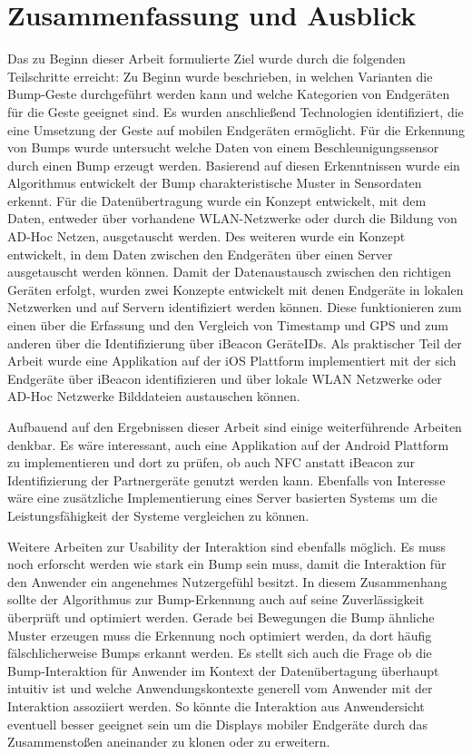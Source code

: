 \chapter{Zusammenfassung und Ausblick}
\label{Kap6}
\label{chap:Kap6}

Das zu Beginn dieser Arbeit formulierte Ziel wurde durch die folgenden Teilschritte erreicht: Zu Beginn wurde beschrieben, in welchen Varianten die Bump-Geste durchgeführt werden kann und welche Kategorien von Endgeräten für die Geste geeignet sind. Es wurden anschließend Technologien identifiziert, die eine Umsetzung der Geste auf mobilen Endgeräten ermöglicht. Für die Erkennung von Bumps wurde untersucht welche Daten von einem Beschleunigungssensor durch einen Bump erzeugt werden. Basierend auf diesen Erkenntnissen wurde ein Algorithmus entwickelt der Bump charakteristische Muster in Sensordaten erkennt. Für die Datenübertragung wurde ein Konzept entwickelt, mit dem Daten, entweder über vorhandene WLAN-Netzwerke oder durch die Bildung von AD-Hoc Netzen, ausgetauscht werden. Des weiteren wurde ein Konzept entwickelt, in dem Daten zwischen den Endgeräten über einen Server ausgetauscht werden können. Damit der Datenaustausch zwischen den richtigen Geräten erfolgt, wurden zwei Konzepte entwickelt mit denen Endgeräte in lokalen Netzwerken und auf Servern identifiziert werden können. Diese funktionieren zum einen über die Erfassung und den Vergleich von Timestamp und GPS und zum anderen über die Identifizierung über iBeacon GeräteIDs. Als praktischer Teil der Arbeit wurde eine Applikation auf der iOS Plattform implementiert mit der sich Endgeräte über iBeacon identifizieren und über lokale WLAN Netzwerke oder AD-Hoc Netzwerke Bilddateien austauschen können.

Aufbauend auf den Ergebnissen dieser Arbeit sind einige weiterführende Arbeiten denkbar. Es wäre interessant, auch eine Applikation auf der Android Plattform zu implementieren und dort zu prüfen, ob auch \ac{NFC} anstatt iBeacon zur Identifizierung der Partnergeräte genutzt werden kann. Ebenfalls von Interesse wäre eine zusätzliche Implementierung eines Server basierten Systems um die Leistungsfähigkeit der Systeme vergleichen zu können.

Weitere Arbeiten zur Usability der Interaktion sind ebenfalls möglich. Es muss noch erforscht werden wie stark ein Bump sein muss, damit die Interaktion für den Anwender ein angenehmes Nutzergefühl besitzt. In diesem Zusammenhang sollte der Algorithmus zur Bump-Erkennung auch auf seine Zuverlässigkeit überprüft und optimiert werden. Gerade bei Bewegungen die Bump ähnliche Muster erzeugen muss die Erkennung noch optimiert werden, da dort häufig fälschlicherweise Bumps erkannt werden. Es stellt sich auch die Frage ob die Bump-Interaktion für Anwender im Kontext der Datenübertagung überhaupt intuitiv ist und welche Anwendungskontexte generell vom Anwender mit der Interaktion assoziiert werden. So könnte die Interaktion aus Anwendersicht eventuell besser geeignet sein um die Displays mobiler Endgeräte durch das Zusammenstoßen aneinander zu klonen oder zu erweitern.